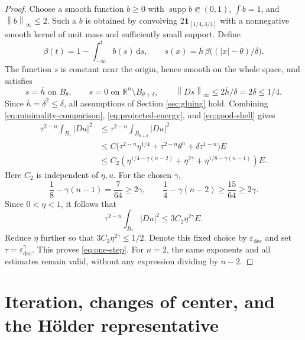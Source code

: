 \documentclass[11pt,a4paper]{article}
\numberwithin{equation}{section}
\theoremstyle{definition}
\newcommand{\R}{\mathbb R}
\newcommand{\dd}{\,\mathrm d}
\newcommand{\supp}{\operatorname{supp}}
\newcommand{\norm}[1]{\left\lVert #1\right\rVert}
\begin{document}
\begin{proof}
Choose a smooth function $b\ge0$ with $\supp b\Subset(0,1)$, $\int b=1$, and $\norm b_\infty\le2$. Such a $b$ is obtained by convolving $2\mathbf1_{[1/4,3/4]}$ with a nonnegative smooth kernel of unit mass and sufficiently small support. Define
\[
\beta(t)=1-\int_{-\infty}^t b(s)\dd s,
\qquad
s(x)=\bar h\,\beta\bigl((|x|-\theta)/\delta\bigr).
\]
The function $s$ is constant near the origin, hence smooth on the whole space, and satisfies
\[
s=\bar h\text{ on }B_\theta,\qquad
s=0\text{ on }\R^n\setminus B_{\theta+\delta},\qquad
\norm{Ds}_\infty\le2\bar h/\delta=2\delta\le1/4.
\]
Since $\bar h=\delta^2\le\delta$, all assumptions of Section \ref{sec:gluing} hold. Combining \eqref{eq:minimality-comparison}, \eqref{eq:projected-energy}, and \eqref{eq:good-shell} gives
\begin{align*}
\tau^{2-n}\int_{B_\tau}|Du|^2
&\le\tau^{2-n}\int_{B_{\theta+\delta}}|Du|^2\\
&\le C\bigl(\tau^{2-n}\eta^{1/4}
+\tau^{2-n}\theta^n+\delta\tau^{1-n}\bigr)E\\
&\le C_2\left(
\eta^{1/4-\gamma(n-2)}+\eta^{2\gamma}
+\eta^{1/8-\gamma(n-1)}\right)E.
\end{align*}
Here $C_2$ is independent of $\eta,u$. For the chosen $\gamma$,
\[
\frac18-\gamma(n-1)=\frac7{64}\ge2\gamma,
\qquad
\frac14-\gamma(n-2)\ge\frac{15}{64}\ge2\gamma.
\]
Since $0<\eta<1$, it follows that
\begin{equation}\label{eq:pre-decay}
\tau^{2-n}\int_{B_\tau}|Du|^2\le3C_2\eta^{2\gamma}E.
\end{equation}
Reduce $\eta$ further so that $3C_2\eta^{2\gamma}\le1/2$. Denote this fixed choice by $\varepsilon_{\mathrm{dec}}$ and set $\tau=\varepsilon_{\mathrm{dec}}^\gamma$. This proves \eqref{eq:one-step}. For $n=2$, the same exponents and all estimates remain valid, without any expression dividing by $n-2$.
\end{proof}

\section{Iteration, changes of center, and the Hölder representative}
\end{document}
